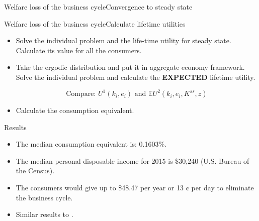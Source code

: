 \documentclass{beamer}
\begin{document}
\begin{frame}{Welfare loss of the business cycle}{Convergence to steady state}
\end{frame}

\begin{frame}{Welfare loss of the business cycle}{Calculate lifetime utilities}
  \begin{itemize}

  \item {
  Solve the individual problem and the life-time utility for steady state. Calculate its value for all the consumers.
  }

  \item {
  Take the ergodic distribution and put it in aggregate economy framework. Solve the individual problem and calculate the \textbf{EXPECTED} lifetime utility. 
  }

  \[\textrm{Compare: }U^1(k_i, e_i) \textrm{ and } \mathbb{E}U^2(k_i, e_i, K^{ss}, z)\]

  \item {
  Calculate the consumption equivalent.  
  }

  \end{itemize}
\end{frame}

\begin{frame}{Results}
  \begin{itemize}

  \item {
  The median consumption equivalent is: 0.1603\%.
  }

  \item {
  The median personal disposable income for 2015 is \$30,240 (U.S. Bureau of the Census).
  }

  \item {
  The consumers would give up to \$48.47 per year or 13 $\cent$ per day to eliminate the business cycle.
  }

  \item {
  Similar results to \citeauthor{ks_99} \cite{ks_99}. 
  }

  \end{itemize}
\end{frame}
\end{document}
